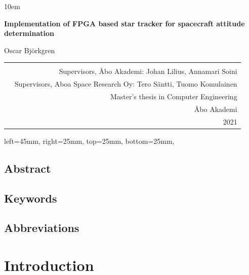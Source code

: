 \documentclass[12pt]{report}
\begin{document}
\emergencystretch 10em
\begin{titlepage}
\begin{center}
        \vspace*{5cm}
        
        \LARGE
        \textbf{Implementation of FPGA based star tracker for spacecraft attitude determination}
        \\
        \vspace{0.5cm}
        
        Oscar Björkgren
        
\end{center}
\vspace{8cm}
\begin{tabular}{l r }
\multirow{4}{10em}{
} \\
\multirow{12}{1em}{
} &

Supervisors, Åbo Akademi: Johan Lilius, Annamari Soini\\ &
Supervisors, Aboa Space Research Oy: Tero Säntti, Tuomo Komulainen\\ & 
Master's thesis in Computer Engineering\\ &
Åbo Akademi\\ &
2021

\end{tabular}

\flushright
\end{titlepage}
\newgeometry
{
 left=45mm,
 right=25mm,
 top=25mm,
 bottom=25mm,
}
\section*{Abstract}
\section*{Keywords}
\section*{Abbreviations}

\tableofcontents
\listoffigures
\listoftables

\chapter{Introduction}
\end{document}
